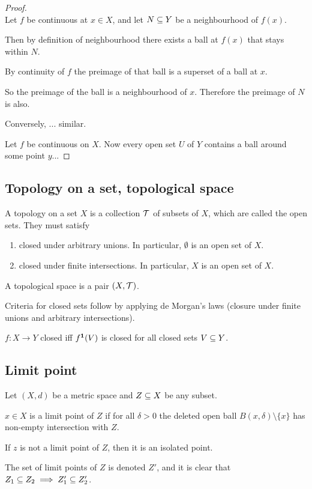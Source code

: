 \begin{proof}~\\
  Let $f$ be continuous at $x \in X$, and let $N \subseteq Y$ be a neighbourhood of $f(x)$.

  Then by definition of neighbourhood there exists a ball at $f(x)$ that stays within $N$.

  By continuity of $f$ the preimage of that ball is a superset of a ball at $x$.

  So the preimage of the ball is a neighbourhood of $x$. Therefore the preimage of $N$ is also.

  Conversely, ... similar.

  Let $f$ be continuous on $X$. Now every open set $U$ of $Y$ contains a ball around some point $y$...
\end{proof}

\subsection{Topology on a set, topological space}
\begin{definition}
  A topology on a set $X$ is a collection $\mathcal T$ of subsets of $X$, which are called the open
  sets. They must satisfy
  \begin{enumerate}
  \item closed under arbitrary unions. In particular, $\emptyset$ is an open set of $X$.
  \item closed under finite intersections. In particular, $X$ is an open set of $X$.
  \end{enumerate}
  A topological space is a pair $(X, \mathcal T)$.
\end{definition}

\begin{remark*}
  Criteria for closed sets follow by applying de Morgan's laws (closure under finite unions and
  arbitrary intersections).

  $f:X\to Y$ closed iff $f^{\mathbf 1}(V)$ is closed for all closed sets $V \subseteq Y$.
\end{remark*}

\subsection{Limit point}
\begin{definition}
  Let $(X, d)$ be a metric space and $Z \subseteq X$ be any subset.

  $x \in X$ is a limit point of $Z$ if for all $\delta > 0$ the deleted open ball
  $B(x, \delta)\setminus\{x\}$ has non-empty intersection with $Z$.

  If $z$ is not a limit point of $Z$, then it is an isolated point.

  The set of limit points of $Z$ is denoted $Z'$, and it is clear that
  $Z_1 \subseteq Z_2 \implies Z_1' \subseteq Z_2'$.
\end{definition}

